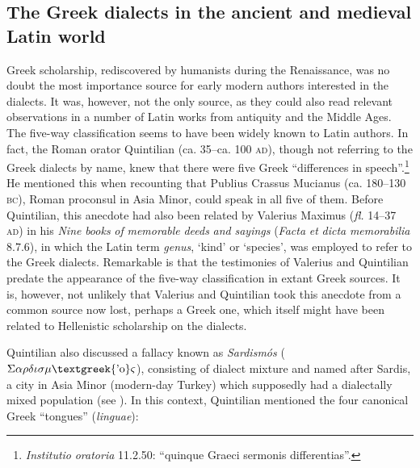 \subsection{The Greek dialects in the ancient and medieval Latin world}
\hypertarget{Toc19704811}{}
Greek scholarship, rediscovered by humanists during the Renaissance, was no doubt the most importance source for early modern authors interested in the dialects. It was, however, not the only source, as they could also read relevant observations in a number of Latin works from antiquity and the Middle Ages. The five-way classification seems to have been widely known to Latin authors. In fact, the Roman orator Quintilian (ca. 35–ca. 100 \textsc{ad}), though not referring to the Greek dialects by name, knew that there were five Greek “differences in speech”.\footnote{ \textrm{\textit{Institutio} \textit{oratoria}} \textrm{11.2.50: “quinque Graeci sermonis differentias”.}} He mentioned this when recounting that Publius Crassus Mucianus (ca. 180–130 \textsc{bc}), Roman proconsul in Asia Minor, could speak in all five of them. Before Quintilian, this anecdote had also been related by Valerius Maximus (\textit{fl.} 14–37 \textsc{ad}) in his \textit{Nine} \textit{books} \textit{of} \textit{memorable} \textit{deeds} \textit{and} \textit{sayings} (\textit{Facta} \textit{et} \textit{dicta} \textit{memorabilia} 8.7.6), in which the Latin term \textit{genus}, ‘kind’ or ‘species’, was employed to refer to the Greek dialects. Remarkable is that the testimonies of Valerius and Quintilian predate the appearance of the five-way classification in extant Greek sources. It is, however, not unlikely that Valerius and Quintilian took this anecdote from a common source now lost, perhaps a Greek one, which itself might have been related to Hellenistic scholarship on the dialects.

Quintilian also discussed a fallacy known as \textit{Sardismós} ($\Sigma \alpha \rho \delta \iota \sigma \mu \text{\textgreek{'o}}\varsigma $), consisting of dialect mixture and named after Sardis, a city in Asia Minor (modern-day Turkey) which supposedly had a dialectally mixed population (see \citealt{Gitner2019}). In this context, Quintilian mentioned the four canonical Greek “tongues” (\textit{linguae}):

